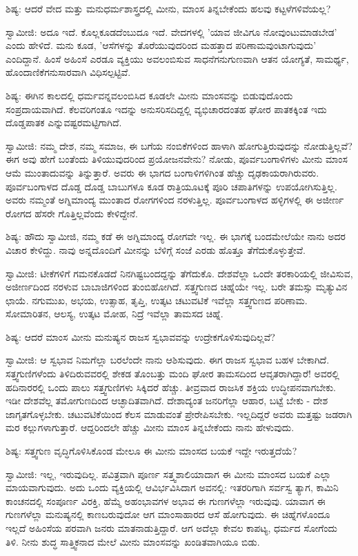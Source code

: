 ಶಿಷ್ಯ: ಆದರೆ ವೇದ ಮತ್ತು ಮನುಧರ್ಮಶಾಸ್ತ್ರದಲ್ಲಿ ಮೀನು, ಮಾಂಸ ತಿನ್ನಬೇಕೆಂದು ಹಲವು ಕಟ್ಟಳೆಗಳಿವೆಯಲ್ಲ?

ಸ್ವಾಮೀಜಿ: ಅದೂ ಇದೆ. ಕೊಲ್ಲಕೂಡದೆಂಬುದೂ ಇದೆ. ವೇದಗಳಲ್ಲಿ 'ಯಾವ ಜೀವಿಗೂ ನೋವುಂಟುಮಾಡಬೇಡ' ಎಂದು ಹೇಳಿದೆ. ಮನು ಕೂಡ, 'ಆಸೆಗಳನ್ನು ತೊರೆಯುವುದರಿಂದ ಮಹತ್ತಾದ ಪರಿಣಾಮವುಂಟಾಗುವುದು' ಎಂದಿದ್ದಾನೆ. ಹಿಂಸೆ ಅಹಿಂಸೆ ಎರಡೂ ವ್ಯಕ್ತಿಯು ಅವಲಂಬಿಸುವ ಸಾಧನೆಗನುಗುಣವಾಗಿ ಆತನ ಯೋಗ್ಯತೆ, ಸಾಮರ್ಥ್ಯ, ಹೊಂದಾಣಿಕೆಗನುಸಾರವಾಗಿ ವಿಧಿಸಲ್ಪಟ್ಟಿವೆ.

ಶಿಷ್ಯ: ಈಗಿನ ಕಾಲದಲ್ಲಿ ಧರ್ಮವನ್ನವಲಂಬಿಸಿದ ಕೂಡಲೇ ಮೀನು ಮಾಂಸವನ್ನು ಬಿಡುವುದೊಂದು ಸಂಪ್ರದಾಯವಾಗಿದೆ. ಕೆಲವರಿಗಂತೂ ಇದನ್ನು ಅನುಸರಿಸದಿದ್ದಲ್ಲಿ ವ್ಯಭಿಚಾರದಂತಹ ಘೋರ ಪಾತಕಕ್ಕಿಂತ ಇದು ದೊಡ್ಡಪಾತಕ ಎನ್ನುವಷ್ಟರಮಟ್ಟಿಗಾಗಿದೆ.

ಸ್ವಾಮೀಜಿ: ನಮ್ಮ ದೇಶ, ನಮ್ಮ ಸಮಾಜ, ಈ ಬಗೆಯ ನಂಬಿಕೆಗಳಿಂದ ಹಾಳಾಗಿ ಹೋಗುತ್ತಿರುವುದನ್ನು ನೋಡುತ್ತಿಲ್ಲವೆ? ಈಗ ಅವು ಹೇಗೆ ಬಂತೆಂದು ತಿಳಿಯುವುದರಿಂದ ಪ್ರಯೋಜನವೇನು? ನೋಡು, ಪೂರ್ವಬಂಗಾಳಿಗಳು ಮೀನು ಮಾಂಸ ಆಮೆ ಮುಂತಾದುವನ್ನು ತಿನ್ನುತ್ತಾರೆ. ಅವರು ಈ ಭಾಗದ ಬಂಗಾಳಿಗಳಿಗಿಂತ ಹೆಚ್ಚು ದೃಢಕಾಯರಾಗಿರುವರು. ಪೂರ್ವಬಂಗಾಳದ ದೊಡ್ಡ ದೊಡ್ಡ ಬಾಬುಗಳೂ ಕೂಡ ರಾತ್ರಿಯೂಟಕ್ಕೆ ಪೂರಿ ಚಪಾತಿಗಳನ್ನು ಉಪಯೋಗಿಸುತ್ತಿಲ್ಲ. ಅವರು ನಮ್ಮಂತೆ ಅಗ್ನಿಮಾಂದ್ಯ ಮುಂತಾದ ರೋಗಗಳಿಂದ ನರಳುತ್ತಿಲ್ಲ. ಪೂರ್ವಬಂಗಾಳದ ಹಳ್ಳಿಗಳಲ್ಲಿ ಈ ಅಜೀರ್ಣ ರೋಗದ ಹೆಸರೇ ಗೊತ್ತಿಲ್ಲವೆಂದು ಕೇಳಿದ್ದೇನೆ.

ಶಿಷ್ಯ: ಹೌದು ಸ್ವಾಮೀಜಿ, ನಮ್ಮ ಕಡೆ ಈ ಅಗ್ನಿಮಾಂದ್ಯ ರೋಗವೇ ಇಲ್ಲ. ಈ ಭಾಗಕ್ಕೆ ಬಂದಮೇಲೆಯೇ ನಾನು ಅದರ ವಿಚಾರ ಕೇಳಿದ್ದು. ನಾವು ಅನ್ನದೊಂದಿಗೆ ಮೀನನ್ನು ಬೆಳಿಗ್ಗೆ ಸಂಜೆ ಎರಡು ಹೊತ್ತೂ ತೆಗೆದುಕೊಳ್ಳುತ್ತೇವೆ.

ಸ್ವಾಮೀಜಿ: ಟೀಕೆಗಳಿಗೆ ಗಮನಕೊಡದೆ ನಿನಗಿಷ್ಟಬಂದದ್ದನ್ನು ತೆಗೆದುಕೊ. ದೇಶವೆಲ್ಲಾ ಒಂದೇ ತರಕಾರಿಯಲ್ಲಿ ಜೀವಿಸುವ, ಅಜೀರ್ಣದಿಂದ ನರಳುವ ಬಾಬಾಜಿಗಳಿಂದ ತುಂಬಿಹೋಗಿದೆ. ಸತ್ತ್ವಗುಣದ ಚಿಹ್ನೆಯೇ ಇಲ್ಲ. ಬರೇ ತಮಸ್ಸು ಮೃತ್ಯುವಿನ ಛಾಯೆ. ನಗುಮುಖ, ಅಭಯ, ಉತ್ಸಾಹ, ತೃಪ್ತಿ, ಉತ್ಕಟ ಚಟುವಟಿಕೆ ಇವೆಲ್ಲಾ ಸತ್ತ್ವಗುಣದ ಪರಿಣಾಮ. ಸೋಮಾರಿತನ, ಆಲಸ್ಯ, ಉತ್ಕಟ ಮೋಹ, ನಿದ್ರೆ ಇವೆಲ್ಲಾ ತಾಮಸದ ಚಿಹ್ನೆ.

ಶಿಷ್ಯ: ಆದರೆ ಮಾಂಸ ಮೀನು ಮನುಷ್ಯನ ರಾಜಸ ಸ್ವಭಾವವನ್ನು ಉದ್ರೇಕಗೊಳಿಸುವುದಿಲ್ಲವೆ?

ಸ್ವಾಮೀಜಿ: ಆ ಸ್ವಭಾವ ನಿಮಗೆಲ್ಲಾ ಬರಲೆಂದೇ ನಾನು ಆಶಿಸುವುದು. ಈಗ ರಾಜಸ ಸ್ವಭಾವ ಬಹಳ ಬೇಕಾಗಿದೆ. ಸತ್ತ್ವಗುಣಿಗಳೆಂದು ತಿಳಿದಿರುವವರಲ್ಲಿ ಶೇಕಡ ತೊಂಬತ್ತು ಮಂದಿ ಘೋರ ತಾಮಸದಿಂದ ಆವೃತರಾಗಿದ್ದಾರೆ! ಅವರಲ್ಲಿ ಹದಿನಾರರಲ್ಲಿ ಒಂದು ಪಾಲು ಸತ್ತ್ವಗುಣಿಗಳು ಸಿಕ್ಕಿದರೆ ಹೆಚ್ಚು. ತೀವ್ರವಾದ ರಾಜಸಿಕ ಶಕ್ತಿಯ ಉದ್ಧೀಪನವಾಗಬೇಕು. ಇಡೀ ದೇಶವೆಲ್ಲ ತಮೋಗುಣದಿಂದ ಆಚ್ಛಾದಿತವಾಗಿದೆ. ದೇಶಾದ್ಯಂತ ಜನರಿಗೆಲ್ಲಾ ಆಹಾರ, ಬಟ್ಟೆ ಬೇಕು - ದೇಶ ಜಾಗೃತಗೊಳ್ಳಬೇಕು. ಚಟುವಟಿಕೆಯಿಂದ ಕೆಲಸ ಮಾಡುವಂತೆ ಪ್ರೇರೇಪಿಸಬೇಕು. ಇಲ್ಲದಿದ್ದರೆ ಅವರು ಮತ್ತಷ್ಟು ಜಡರಾಗಿ ಮರ ಕಲ್ಲುಗಳಾಗುತ್ತಾರೆ. ಆದ್ದರಿಂದಲೇ ಹೆಚ್ಚು ಮೀನು ಮಾಂಸ ತಿನ್ನಬೇಕೆಂದು ನಾನು ಹೇಳುವುದು.

ಶಿಷ್ಯ: ಸತ್ತ್ವಗುಣ ವೃದ್ಧಿಗೊಳಿಸಿಕೊಂಡ ಮೇಲೂ ಈ ಮೀನು ಮಾಂಸದ ಬಯಕೆ ಇದ್ದೇ ಇರುತ್ತದೆಯೆ?

ಸ್ವಾಮೀಜಿ: ಇಲ್ಲ, ಇರುವುದಿಲ್ಲ. ಪವಿತ್ರವಾಗಿ ಪೂರ್ಣ ಸತ್ತ್ವಶಾಲಿಯಾದಾಗ ಈ ಮೀನು ಮಾಂಸದ ಬಯಕೆ ಎಲ್ಲಾ ಮಾಯವಾಗುವುದು. ಅದು ಒಂದು ವ್ಯಕ್ತಿಯಲ್ಲಿ ಆವಿರ್ಭವಿಸಿದಾಗ ಅವನಲ್ಲಿ: ಇತರರಿಗಾಗಿ ಸರ್ವಸ್ವ ತ್ಯಾಗ, ಕಾಮಿನಿ ಕಾಂಚನದಲ್ಲಿ ಸಂಪೂರ್ಣ ವಿರಕ್ತಿ, ಹೆಮ್ಮೆ ಅಹಂಭಾವಗಳ ಅಭಾವ ಈ ಗುಣಗಳೆಲ್ಲಾ ಇರುವುವು. ಯಾವಾಗ ಈ ಗುಣಗಳೆಲ್ಲಾ ಮನುಷ್ಯನಲ್ಲಿ ಕಾಣಬರುವುದೋ ಆಗ ಮಾಂಸಾಹಾರದ ಆಸೆ ಹೋಗುವುದು. ಈ ಚಿಹ್ನೆಗಳೊಂದೂ ಇಲ್ಲದೆ ಅಹಿಂಸೆಯ ಪರವಾಗಿ ಜನರು ಮಾತನಾಡುತ್ತಿದ್ದಾರೆ. ಆಗ ಅದೆಲ್ಲಾ ಕೇವಲ ಕಾಪಟ್ಯ, ಧರ್ಮದ ಸೋಗೆಂದು ತಿಳಿ. ನೀನು ಶುದ್ಧ ಸಾತ್ತ್ವಿಕನಾದ ಮೇಲೆ ಮೀನು ಮಾಂಸವನ್ನು ಖಂಡಿತವಾಗಿಯೂ ಬಿಡು.


